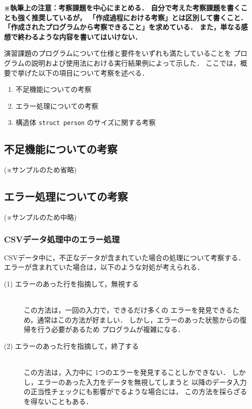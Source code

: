 \documentclass[a4j,11pt]{jarticle}
\begin{document}
\textbf{\small ※執筆上の注意：考察課題を中心にまとめる．
    自分で考えた考察課題を書くことも強く推奨しているが，
    「作成過程における考察」とは区別して書くこと．
    「作成されたプログラムから考察できること」を求めている．
    また，単なる感想で終わるような内容を書いてはいけない．\\}

演習課題のプログラムについて仕様と要件をいずれも満たしていることを
プログラムの説明および使用法における実行結果例によって示した．
ここでは，概要で挙げた以下の項目について考察を述べる．

\begin{enumerate}
\setlength{\parskip}{2pt} \setlength{\itemsep}{2pt}
    \item 不足機能についての考察
    \item エラー処理についての考察
    \item 構造体 \verb|struct person| のサイズに関する考察
\end{enumerate}

\subsection{不足機能についての考察}

(※サンプルのため省略)

\subsection{エラー処理についての考察}

(※サンプルのため中略)

\subsubsection{CSVデータ処理中のエラー処理}

CSVデータ中に，不正なデータが含まれていた場合の処理について考察する．
エラーが含まれていた場合は，以下のような対処が考えられる．

\begin{description} %
  \item[(1) エラーのあった行を指摘して，無視する]~\\
    この方法は，一回の入力で，できるだけ多くの
    エラーを発見できるため，通常はこの方法が好ましい．
    しかし，エラーのあった状態からの復帰を行う必要があるため
    プログラムが複雑になる．
  \item[(2) エラーのあった行を指摘して，終了する]~\\
    この方法は，入力中に 1つのエラーを発見することしかできない．
    しかし，エラーのあった入力をデータを無視してしまうと
    以降のデータ入力の正当性チェックにも影響がでるような場合には，
    この方法を採らざるを得ないこともある．
\end{description}
\end{document}
